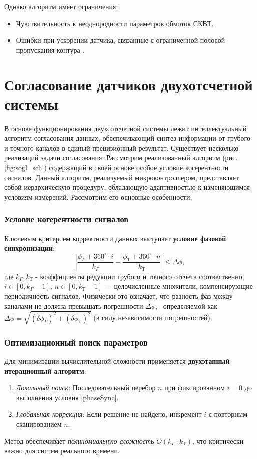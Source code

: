 Однако алгоритм имеет ограничения:
\begin{itemize}
    \item Чувствительность к неоднородности параметров обмоток СКВТ.
    \item Ошибки при ускорении датчика, связанные с ограниченной полосой пропускания контура \cite{Anufriev2014}.
\end{itemize}


\section{Согласование датчиков двухотсчетной системы}
В основе функционирования двухсотсчетной системы лежит интеллектуальный алгоритм согласования данных, обеспечивающий синтез информации от грубого и точного каналов 
в единый прецизионный результат. Существует несколько реализаций задачи согласования.\cite{Sogl} Рассмотрим реализованный алгоритм (рис. \ref{fig:sogl_sch}) содержащий в своей основе особое условие когерентности сигналов.
Данный алгоритм, реализуемый микроконтроллером, представляет собой иерархическую процедуру, обладающую адаптивностью к изменяющимся условиям измерений. 
Рассмотрим его основные особенности.

\subsubsection{Условие когерентности сигналов}
Ключевым критерием корректности данных выступает \textbf{условие фазовой синхронизации}:
\begin{equation}
    \left| \frac{\phi_{\Gamma} + 360^{\circ} \cdot i}{k_{\Gamma}} - \frac{\phi_{\text{Т}} + 360^{\circ} \cdot n}{k_{\text{Т}}} \right| \leq \Delta\phi,
    \label{phaseSync}
\end{equation}
где $k_{\Gamma}, k_{\text{Т}}$ - коэффициенты редукции грубого и точного отсчета соотвественно,$ i \in [0, k_{\Gamma}-1]$, $n \in [0, k_{\text{Т}}-1]$ — целочисленные множители, компенсирующие периодичность сигналов.
 Физически это означает, что разность фаз между каналами не должна превышать погрешности $\Delta\phi$, \
 определяемой как $\Delta\phi = \sqrt{(\delta\phi_{\Gamma})^2 + (\delta\phi_{\text{Т}})^2}$ (в силу независимости погрешностей).

\subsubsection{Оптимизационный поиск параметров}
Для минимизации вычислительной сложности применяется \textbf{двухэтапный итерационный алгоритм}:
\begin{enumerate}
    \item \textit{Локальный поиск}: Последовательный перебор $n$ при фиксированном $i=0$ до выполнения условия \ref{phaseSync}. 
    \item \textit{Глобальная коррекция}: Если решение не найдено, инкремент $i$ с повторным сканированием $n$.
\end{enumerate}
Метод обеспечивает \textit{полиномиальную сложность} $O(k_{\Gamma} \cdot k_{\text{Т}})$, что критически важно для систем реального времени.


